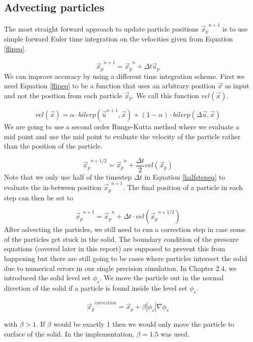 \subsection{Advecting particles}

The most straight forward approach to update particle positions ${\vec{x}_p}^{n+1}$ is to use simple forward Euler time integration on the velocities given from Equation \ref{flipeq}. 

\begin{equation}
{\vec{x}_p}^{n+1} = {\vec{x}_p}^n + \Delta t \vec{u}_p 
\label{eulerstepeq}
\end{equation}
\noindent
We can improve accuracy by using a different time integration scheme. First we need Equation \ref{flipeq} to be a function that uses an arbitrary position $\vec{x}$ as input and not the position from each particle $\vec{x}_p$. We call this function $vel(\vec{x})$.

\begin{equation}
vel(\vec{x}) = \alpha \cdot bilerp(\vec{u}^{n+1}, \vec{x}) + (1-\alpha) \cdot bilerp(\Delta \vec{u},\vec{x})
\label{veleq}
\end{equation}
\noindent
We are going to use a second order Runge-Kutta method where we evaluate a mid point and use the mid point to evaluate the velocity of the particle rather than the position of the particle.

\begin{equation}
{\vec{x}_p}^{n + 1/2} = {\vec{x}_p}^n + \frac{\Delta t}{2} vel(\vec{x}_p)
\label{halfstepeq}
\end{equation}
\noindent
Note that we only use half of the timestep $\Delta t$ in Equation \ref{halfstepeq} to evaluate the in-between position ${\vec{x}_p}^{n+1}$. The final position of a particle in each step can then be set to

\begin{equation}
{\vec{x}_p}^{n + 1} = {\vec{x}_p}^n + \Delta t \cdot vel({\vec{x}_p}^{n+1/2})
\end{equation}
\noindent
After advecting the particles, we still need to run a correction step in case some of the particles get stuck in the solid. The boundary condition of the pressure equations (covered later in this report) are supposed to prevent this from happening but there are still going to be cases where particles intersect the solid due to numerical errors in our single precision simulation. In Chapter 2.4, we introduced the solid level set $\phi_s$. We move the particle out in the normal direction of the solid if a particle is found inside the level set $\phi_s$.

\begin{equation}
{\vec{x}_p}^{correction} = \vec{x}_p + \beta |\phi_s|\nabla\phi_s
\end{equation}

with $\beta > 1$. If $\beta$ would be exactly 1 then we would only move the particle to surface of the solid. In the implementation, $\beta = 1.5$ was used.
